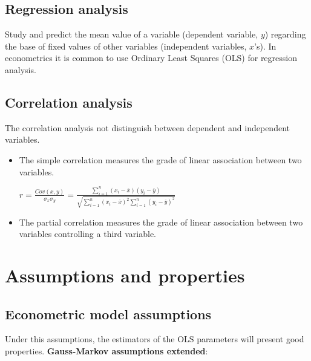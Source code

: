 \documentclass[10pt, a4paper, landscape]{extarticle}
\begin{document}
\begin{multicols}{3}
\subsection*{Regression analysis}
Study and predict the mean value of a variable (dependent variable, $y$) regarding the base of fixed values of other variables (independent variables, $x$'s). In econometrics it is common to use Ordinary Least Squares (OLS) for regression analysis.

\subsection*{Correlation analysis}
The correlation analysis not distinguish between dependent and independent variables.

\begin{itemize}[leftmargin=*]
\item The simple correlation measures the grade of linear association between two variables.

\begin{center}
$r = \frac{Cov(x,y)}{\sigma_x \sigma_y} = \frac{\sum_{i=1}^n (x_i - \overline{x})(y_i - \overline{y})}{\sqrt{\sum_{i=1}^n (x_i - \overline{x})^2 \sum_{i=1}^n (y_i - \overline{y})^2}}$
\end{center}

\item The partial correlation measures the grade of linear association between two variables controlling a third variable.
\end{itemize}

\columnbreak

\section*{Assumptions and properties}
\subsection*{Econometric model assumptions}

Under this assumptions, the estimators of the OLS parameters will present good properties. \textbf{Gauss-Markov assumptions extended}:


\end{multicols}
\end{document}
